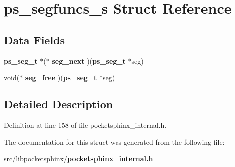 \section{ps\-\_\-segfuncs\-\_\-s Struct Reference}
\label{structps__segfuncs__s}
\subsection*{Data Fields}
\begin{DoxyCompactItemize}
\item 
{\bf ps\-\_\-seg\-\_\-t} $\ast$($\ast$ {\bfseries seg\-\_\-next} )({\bf ps\-\_\-seg\-\_\-t} $\ast$seg)\label{structps__segfuncs__s_a8d9d7ccdb757620830d352d5fece4119}

\item 
void($\ast$ {\bfseries seg\-\_\-free} )({\bf ps\-\_\-seg\-\_\-t} $\ast$seg)\label{structps__segfuncs__s_abbc6c03c53212c4b973f3a0e4121e2ba}

\end{DoxyCompactItemize}


\subsection{Detailed Description}


Definition at line 158 of file pocketsphinx\-\_\-internal.\-h.



The documentation for this struct was generated from the following file\-:\begin{DoxyCompactItemize}
\item 
src/libpocketsphinx/{\bf pocketsphinx\-\_\-internal.\-h}\end{DoxyCompactItemize}
